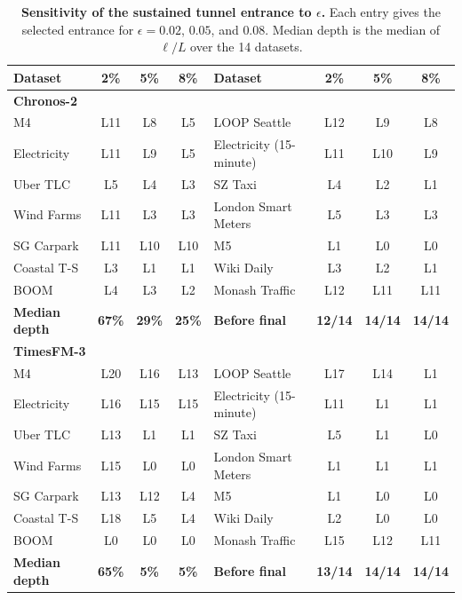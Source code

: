 \documentclass{article} %
\begin{document}
\begin{table}[p]
  \centering
  \caption{\textbf{Sensitivity of the sustained tunnel entrance to $\epsilon$.} Each entry gives the selected entrance for $\epsilon=0.02$, $0.05$, and $0.08$. Median depth is the median of $\ell/L$ over the 14 datasets.}
  \vspace{4pt}
  \label{tab:tunnel_sensitivity}
  \small
  \setlength{\tabcolsep}{3.5pt}
  \begin{tabular}{@{}lccc@{\qquad}lccc@{}}
  \toprule
  Dataset & 2\% & 5\% & 8\% &
  Dataset & 2\% & 5\% & 8\% \\
  \midrule
  \multicolumn{8}{l}{\textbf{Chronos-2}} \\
  M4 & L11 & L8 & L5 & LOOP Seattle & L12 & L9 & L8 \\
  Electricity & L11 & L9 & L5 & Electricity (15-minute) & L11 & L10 & L9 \\
  Uber TLC & L5 & L4 & L3 & SZ Taxi & L4 & L2 & L1 \\
  Wind Farms & L11 & L3 & L3 & London Smart Meters & L5 & L3 & L3 \\
  SG Carpark & L11 & L10 & L10 & M5 & L1 & L0 & L0 \\
  Coastal T-S & L3 & L1 & L1 & Wiki Daily & L3 & L2 & L1 \\
  BOOM & L4 & L3 & L2 & Monash Traffic & L12 & L11 & L11 \\
  \textbf{Median depth} & \textbf{67\%} & \textbf{29\%} & \textbf{25\%} &
  \textbf{Before final} & \textbf{12/14} & \textbf{14/14} & \textbf{14/14} \\
  \midrule
  \multicolumn{8}{l}{\textbf{TimesFM-3}} \\
  M4 & L20 & L16 & L13 & LOOP Seattle & L17 & L14 & L1 \\
  Electricity & L16 & L15 & L15 & Electricity (15-minute) & L11 & L1 & L1 \\
  Uber TLC & L13 & L1 & L1 & SZ Taxi & L5 & L1 & L0 \\
  Wind Farms & L15 & L0 & L0 & London Smart Meters & L1 & L1 & L1 \\
  SG Carpark & L13 & L12 & L4 & M5 & L1 & L0 & L0 \\
  Coastal T-S & L18 & L5 & L4 & Wiki Daily & L2 & L0 & L0 \\
  BOOM & L0 & L0 & L0 & Monash Traffic & L15 & L12 & L11 \\
  \textbf{Median depth} & \textbf{65\%} & \textbf{5\%} & \textbf{5\%} &
  \textbf{Before final} & \textbf{13/14} & \textbf{14/14} & \textbf{14/14} \\

\end{tabular}
\end{table}
\end{document}
